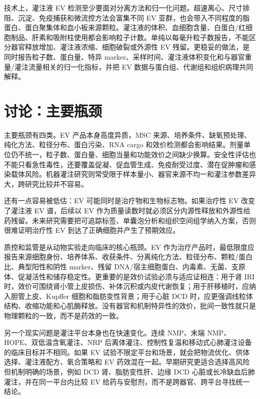 \documentclass[11pt,a4paper]{article}
\begin{document}
技术上，灌注液 EV 检测至少要面对分离方法和归一化问题。超速离心、尺寸排阻、沉淀、免疫捕获和微流控方法会富集不同 EV
亚群，也会带入不同程度的脂蛋白、蛋白聚集体和血小板来源颗粒。灌注液的体积、血细胞含量、白蛋白/红细胞制品、肝素和吸附柱使用都会影响粒子计数。单纯以每毫升粒子数报告，不能区分器官释放增加、灌注液浓缩、细胞破裂或外源性
EV 残留。更稳妥的做法，是同时报告粒子数、蛋白量、特异 marker、采样时间、灌注液体积变化和与器官重量/灌注流量相关的归一化指标，并把 EV
数据与蛋白组、代谢组和组织病理共同解释\cite{massspectrometrybased2023, smallmoleculemetabolites2023}。

\section{讨论：主要瓶颈}\label{ux8ba8ux8bbaux4e3bux8981ux74f6ux9888}

主要瓶颈有四类。EV 产品本身高度异质，MSC
来源、培养条件、缺氧预处理、纯化方法、粒径分布、蛋白污染、RNA cargo
和效价检测都会影响结果。剂量单位仍不统一，粒子数、蛋白量、细胞当量和功能效价之间缺少换算。安全性评估也不能只看急性毒性，还要覆盖促凝、促血管生成、免疫耐受过度、潜在促肿瘤和感染载体风险。机器灌注研究则常受限于样本量小、器官来源不均一和灌注参数差异大，跨研究比较并不容易。

还有一点容易被低估：EV 可能同时是治疗物和生物标志物。如果治疗性 EV
改变了灌注液 EV 谱，后续以 EV
作为质量读数时就必须区分内源性释放和外源性给药残留。未来研究需要把可追踪标签、单囊泡分析和组织空间组学纳入方案，否则很难证明治疗性
EV 到达了正确细胞并产生了预期效应。

质控和监管是从动物实验走向临床的核心瓶颈。EV
作为治疗产品时，最低限度应报告来源细胞身份、培养体系、收获条件、分离纯化方法、粒径分布、颗粒/蛋白比、典型阳性和阴性 marker、残留 DNA/宿主细胞蛋白、内毒素、无菌、支原体、促凝活性和储存稳定性。更重要的是效价试验必须与适应证相连：用于肾 IRI
时，效价可围绕肾小管上皮损伤、补体沉积或内皮代谢恢复；用于肝移植时，应纳入胆管上皮、Kupffer
细胞和脂肪变性背景；用于心脏 DCD 时，应更强调线粒体结构、收缩功能和心肌酶释放。没有器官和机制特异性的效价，批间一致性就只是物理颗粒的一致，而不是药效的一致。

另一个现实问题是灌注平台本身也在快速变化。连续 NMP、末端 NMP、HOPE、双低温含氧灌注、NRP
后离体灌注、控制性复温和移动式心肺灌注设备的临床目标并不相同\cite{editorialgraftpreservation2024, heartgraftpreservation2023, comparisonbetweenterminal2023}。如果 EV
试验不限定平台和场景，就会把物流优化、供体选择、灌注液配方、氧合策略和 EV
药效混在一起。早期研究更适合选择高风险但机制明确的场景，例如 DCD 肾、脂肪变性肝、边缘 DCD
心脏或长冷缺血后肺灌注，并在同一平台内比较 EV 给药与安慰剂，而不是跨器官、跨平台寻找统一结论。
\end{document}
